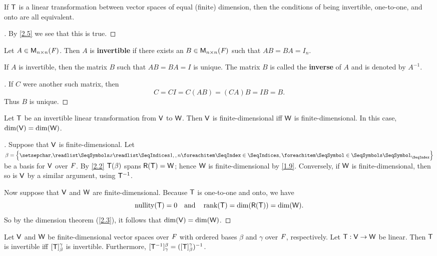 \begin{cor}\label{2.4.2}
  If \(\mathsf{T}\) is a linear transformation between vector spaces of equal (finite) dimension, then the conditions of being invertible, one-to-one, and onto are all equivalent.
\end{cor}

\begin{proof}[]
  By \cref{2.5} we see that this is true.
\end{proof}

\begin{defn}\label{2.4.3}
  Let \(A \in \mathsf{M}_{{n} \times n}({\mathit{F}})\).
  Then \(A\) is \textbf{invertible} if there exists an \(B \in \mathsf{M}_{{n} \times n}({\mathit{F}})\) such that \(AB = BA = I_n\).
\end{defn}

\begin{cor}\label{2.4.4}
  If \(A\) is invertible, then the matrix \(B\) such that \(AB = BA = I\) is unique.
  The matrix \(B\) is called the \textbf{inverse} of \(A\) and is denoted by \(A^{-1}\).
\end{cor}

\begin{proof}[]
  If \(C\) were another such matrix, then
  \[
    C = CI = C(AB) = (CA)B = IB = B.
  \]
  Thus \(B\) is unique.
\end{proof}

\begin{lem}\label{2.4.5}
  Let \(\mathsf{T}\) be an invertible linear transformation from \(\mathsf{V}\) to \(\mathsf{W}\).
  Then \(\mathsf{V}\) is finite-dimensional iff \(\mathsf{W}\) is finite-dimensional.
  In this case, \(\dim(\mathsf{V}) = \dim(\mathsf{W})\).
\end{lem}

\begin{proof}[]
  Suppose that \(\mathsf{V}\) is finite-dimensional.
  Let \(\beta = \set{\seq{x}{1,,n}}\) be a basis for \(\mathsf{V}\) over \(\mathit{F}\).
  By \cref{2.2} \(\mathsf{T}(\beta)\) spans \(\rg{\T} = \W\);
  hence \(\mathsf{W}\) is finite-dimensional by \cref{1.9}.
  Conversely, if \(\mathsf{W}\) is finite-dimensional, then so is \(\mathsf{V}\) by a similar argument, using \(\mathsf{T}^{-1}\).

  Now suppose that \(\mathsf{V}\) and \(\mathsf{W}\) are finite-dimensional.
  Because \(\mathsf{T}\) is one-to-one and onto, we have
  \[
    \nt{\T} = 0 \quad \text{and} \quad \rk{\T} = \dim(\rg{\T}) = \dim(\W).
  \]
  So by the dimension theorem (\cref{2.3}), it follows that \(\dim(\mathsf{V}) = \dim(\mathsf{W})\).
\end{proof}

\begin{thm}\label{2.18}
  Let \(\mathsf{V}\) and \(\mathsf{W}\) be finite-dimensional vector spaces over \(\mathit{F}\) with ordered bases \(\beta\) and \(\gamma\) over \(\mathit{F}\), respectively.
  Let \(\mathsf{T} : \mathsf{V} \to \mathsf{W}\) be linear.
  Then \(\mathsf{T}\) is invertible iff \([\mathsf{T}]_{\beta}^{\gamma}\) is invertible.
  Furthermore, \([\mathsf{T}^{-1}]_{\gamma}^{\beta} = ([\mathsf{T}]_{\beta}^{\gamma})^{-1}\).
\end{thm}

